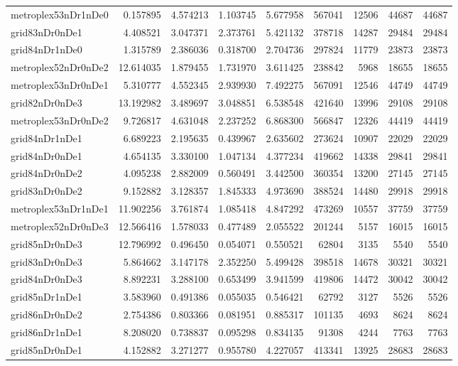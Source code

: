 \begin{longtable}{|l|r|r|r|r|r|r|r|r|}
metroplex53nDr1nDe0 & 0.157895 & 4.574213 & 1.103745 & 5.677958 & 567041 & 12506 & 44687 & 44687 \\
grid83nDr0nDe1 & 4.408521 & 3.047371 & 2.373761 & 5.421132 & 378718 & 14287 & 29484 & 29484 \\
grid84nDr1nDe0 & 1.315789 & 2.386036 & 0.318700 & 2.704736 & 297824 & 11779 & 23873 & 23873 \\
metroplex52nDr0nDe2 & 12.614035 & 1.879455 & 1.731970 & 3.611425 & 238842 & 5968 & 18655 & 18655 \\
metroplex53nDr0nDe1 & 5.310777 & 4.552345 & 2.939930 & 7.492275 & 567091 & 12546 & 44749 & 44749 \\
grid82nDr0nDe3 & 13.192982 & 3.489697 & 3.048851 & 6.538548 & 421640 & 13996 & 29108 & 29108 \\
metroplex53nDr0nDe2 & 9.726817 & 4.631048 & 2.237252 & 6.868300 & 566847 & 12326 & 44419 & 44419 \\
grid84nDr1nDe1 & 6.689223 & 2.195635 & 0.439967 & 2.635602 & 273624 & 10907 & 22029 & 22029 \\
grid84nDr0nDe1 & 4.654135 & 3.330100 & 1.047134 & 4.377234 & 419662 & 14338 & 29841 & 29841 \\
grid84nDr0nDe2 & 4.095238 & 2.882009 & 0.560491 & 3.442500 & 360354 & 13200 & 27145 & 27145 \\
grid83nDr0nDe2 & 9.152882 & 3.128357 & 1.845333 & 4.973690 & 388524 & 14480 & 29918 & 29918 \\
metroplex53nDr1nDe1 & 11.902256 & 3.761874 & 1.085418 & 4.847292 & 473269 & 10557 & 37759 & 37759 \\
metroplex52nDr0nDe3 & 12.566416 & 1.578033 & 0.477489 & 2.055522 & 201244 & 5157 & 16015 & 16015 \\
grid85nDr0nDe3 & 12.796992 & 0.496450 & 0.054071 & 0.550521 & 62804 & 3135 & 5540 & 5540 \\
grid83nDr0nDe3 & 5.864662 & 3.147178 & 2.352250 & 5.499428 & 398518 & 14678 & 30321 & 30321 \\
grid84nDr0nDe3 & 8.892231 & 3.288100 & 0.653499 & 3.941599 & 419806 & 14472 & 30042 & 30042 \\
grid85nDr1nDe1 & 3.583960 & 0.491386 & 0.055035 & 0.546421 & 62792 & 3127 & 5526 & 5526 \\
grid86nDr0nDe2 & 2.754386 & 0.803366 & 0.081951 & 0.885317 & 101135 & 4693 & 8624 & 8624 \\
grid86nDr1nDe1 & 8.208020 & 0.738837 & 0.095298 & 0.834135 & 91308 & 4244 & 7763 & 7763 \\
grid85nDr0nDe1 & 4.152882 & 3.271277 & 0.955780 & 4.227057 & 413341 & 13925 & 28683 & 28683 \\

\end{longtable}
